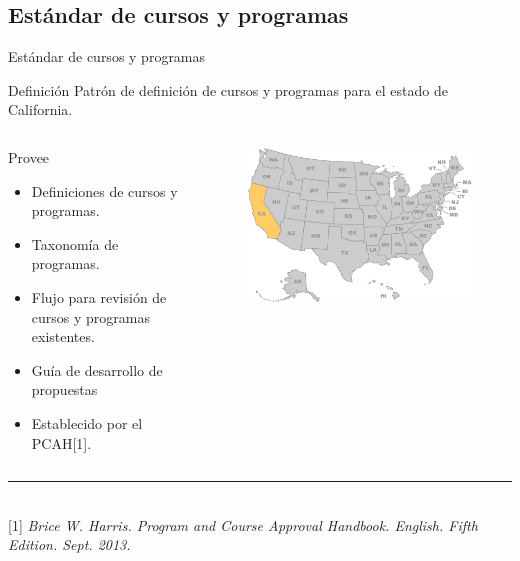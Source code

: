 \documentclass[10pt,xcolor=table ]{beamer}
\newcommand{\decoRule}{\rule{\textwidth}{.4pt}} %
\begin{document}
\subsection{Estándar de cursos y programas}
\begin{frame}{Estándar de cursos y programas}
	\begin{alertblock}{Definición}
		Patrón de definición de cursos y programas para el estado de California.
	\end{alertblock}

	\begin{columns}[c,onlytextwidth]
		\begin{block}{Provee}
			\begin{itemize}
				\item Definiciones de cursos y programas.
				\item Taxonomía de programas.
				\item Flujo para revisión de cursos y programas existentes.
				\item Guía de desarrollo de propuestas
				\item Establecido por el PCAH[1].
			\end{itemize}
		\end{block}
		\begin{figure}
		    \includegraphics[scale=0.25]{../Figuras/usmap-ca}
		\end{figure}
  	\end{columns}
  	\decoRule \\
  \tiny [1] \textit{Brice W. Harris. Program and Course Approval Handbook. English. Fifth Edition. Sept. 2013.} \\
\end{frame}
\end{document}
